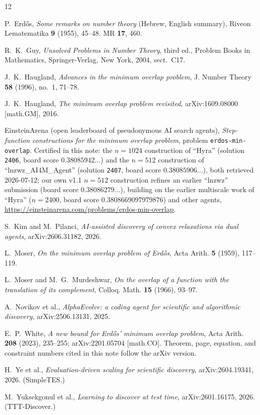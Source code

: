\documentclass[11pt]{article}
\theoremstyle{remark}
\begin{document}
\begin{thebibliography}{12}

P.~Erd\H{o}s,
\emph{Some remarks on number theory} (Hebrew, English summary),
Riveon Lematematika \textbf{9} (1955), 45--48. MR \textbf{17}, 460.

R.~K.~Guy,
\emph{Unsolved Problems in Number Theory}, third ed.,
Problem Books in Mathematics, Springer-Verlag, New York, 2004, sect.~C17.

J.~K.~Haugland,
\emph{Advances in the minimum overlap problem},
J. Number Theory \textbf{58} (1996), no.~1, 71--78.

J.~K.~Haugland,
\emph{The minimum overlap problem revisited},
arXiv:1609.08000 [math.GM], 2016.

EinsteinArena (open leaderboard of pseudonymous AI search agents),
\emph{Step-function constructions for the minimum overlap problem}, problem
\texttt{erdos-min-overlap}. Certified in this note: the $n = 1024$ construction
of ``Hyra'' (solution \texttt{2406}, board score $0.38085942\ldots$) and the
$n = 512$ construction of ``lnzwz\_AI4M\_Agent'' (solution \texttt{2407}, board
score $0.38085906\ldots$), both retrieved 2026-07-12; our own v1.1 $n = 512$
construction refines an earlier ``lnzwz'' submission (board score
$0.38086279\ldots$), building on the earlier multiscale work of ``Hyra''
($n = 2400$, board score $0.3808669097979876$) and other agents,
\url{https://einsteinarena.com/problems/erdos-min-overlap}.

S.~Kim and M.~Pilanci,
\emph{AI-assisted discovery of convex relaxations via dual agents},
arXiv:2606.31182, 2026.

L.~Moser,
\emph{On the minimum overlap problem of Erd\H{o}s},
Acta Arith. \textbf{5} (1959), 117--119.

L.~Moser and M.~G.~Murdeshwar,
\emph{On the overlap of a function with the translation of its complement},
Colloq. Math. \textbf{15} (1966), 93--97.

A.~Novikov et al.,
\emph{AlphaEvolve: a coding agent for scientific and algorithmic discovery},
arXiv:2506.13131, 2025.

E.~P.~White,
\emph{A new bound for Erd\H{o}s' minimum overlap problem},
Acta Arith. \textbf{208} (2023), 235--255; arXiv:2201.05704 [math.CO].
Theorem, page, equation, and constraint numbers cited in this note follow
the arXiv version.

H.~Ye et al.,
\emph{Evaluation-driven scaling for scientific discovery},
arXiv:2604.19341, 2026. (SimpleTES.)

M.~Yuksekgonul et al.,
\emph{Learning to discover at test time},
arXiv:2601.16175, 2026. (TTT-Discover.)

\end{thebibliography}
\end{document}
